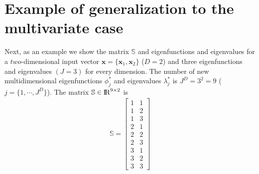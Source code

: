 \documentclass[]{interact}
\theoremstyle{plain}%
\theoremstyle{definition}
\theoremstyle{remark}
\begin{document}
\section{Example of generalization to the multivariate case}

Next, as an example we show the matrix $\mathbb{S}$ and eigenfunctions and eigenvalues for a $two$-dimensional input vector $\mathbf{x}=\{\mathbf{x}_1,\mathbf{x}_2\}$ ($D=2$) and three eigenfunctions and eigenvalues $(J=3)$ for every dimension. The number of new multidimensional eigenfunctions $\phi^{\ast}_j$ and eigenvalues $\lambda^{\ast}_j$ is $J^D=3^2=9$ ($j=\{1,\cdots,J^D\}$). The matrix $\mathbb{S}\in {\rm I\!R}^{9 \times 2}$ is
%
\begin{eqnarray}
\mathbb{S}=
\left[ {\begin{array}{cc}
1 & 1 \nonumber \\
1 & 2 \\
1 & 3 \\
2 & 1 \\
2 & 2 \\
2 & 3 \\
3 & 1 \\
3 & 2 \\
3 & 3
\end{array} } \right]
\end{eqnarray} 
\end{document}
